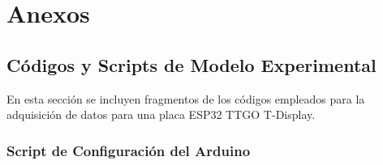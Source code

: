 \chapter{Anexos}
\thispagestyle{fancy}

\appendix
\renewcommand\thesection{\Alph{section}}
\section{Códigos y Scripts de Modelo Experimental}
En esta sección se incluyen fragmentos de los códigos empleados para la adquisición de datos para una placa ESP32 TTGO T-Display.

\subsection{Script de Configuración del Arduino}


